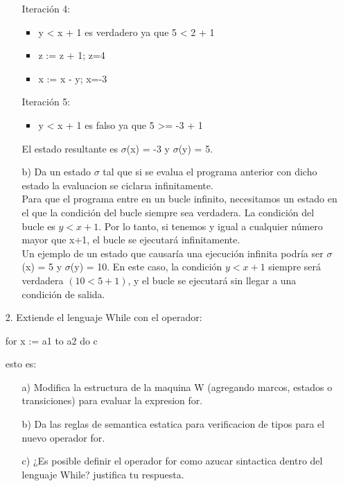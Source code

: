 \documentclass{article}
\begin{document}
\begin{itemize}
\begin{itemize}
            Iteración 4:
            \begin{itemize}
                \item y < x + 1 es verdadero ya que 5 < 2 + 1
                \item z := z + 1; z=4
                \item x := x - y; x=-3
            \end{itemize}

            Iteración 5:
            \begin{itemize}
                \item y < x + 1 es falso ya que 5 >= -3 + 1
            \end{itemize}

            El estado resultante es $\sigma$(x) = -3 y $\sigma$(y) = 5.

            \item[b)] Da un estado $\sigma$ tal que si se evalua el programa anterior con dicho estado la evaluacion se ciclarıa infinitamente.\\

            Para que el programa entre en un bucle infinito, necesitamos un estado en el que la condición del bucle siempre sea verdadera. La condición del bucle es $y<x+1$. Por lo tanto, si tenemos y igual a cualquier número mayor que x+1, el bucle se ejecutará infinitamente.\\

            Un ejemplo de un estado que causaría una ejecución infinita podría ser $\sigma$(x) = 5 y $\sigma$(y) = 10. En este caso, la condición $y<x+1$ siempre será verdadera $(10<5+1)$, y el bucle se ejecutará sin llegar a una condición de salida.
        \end{itemize}

        \item[2.] Extiende el lenguaje While con el operador:
        \begin{center}
        for x := a1 to a2 do c
        \end{center}
        esto es:
        \begin{itemize}
            \item[a)] Modifica la estructura de la maquina W (agregando marcos, estados o transiciones) para evaluar la expresion for.
            \item[b)] Da las reglas de semantica estatica para verificacion de tipos para el nuevo operador for.
            \item[c)] ¿Es posible definir el operador for como azucar sintactica dentro del lenguaje While? justifica tu respuesta.
        \end{itemize}


\end{itemize}
\end{document}
